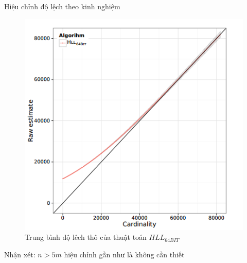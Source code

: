 \documentclass{beamer}
\begin{document}
\begin{frame}{Hiệu chỉnh độ lệch theo kinh nghiệm}

\begin{figure}[h]
\includegraphics[scale=0.5]{img1.png}
\caption{Trung bình độ lêch thô của thuật toán $HLL_{64BIT}$}
\end{figure}
{\color{hilight} Nhận xét:}  $n > 5m$ hiệu chỉnh gần như là không  cần thiết
\end{frame}
\end{document}
